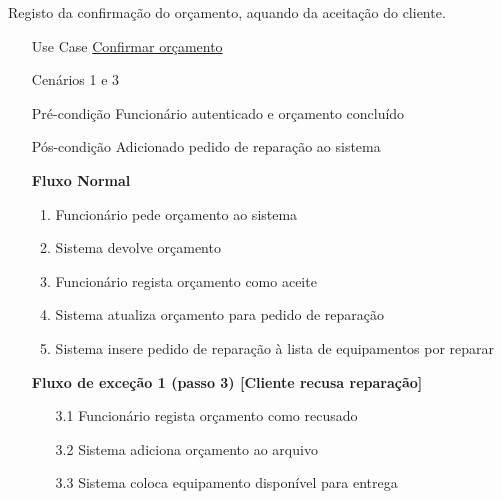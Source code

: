 \documentclass[../relatorio.tex]{subfiles}
\begin{document}
Registo da confirmação do orçamento, aquando da aceitação do cliente.
\begin{itemize}
    \item[Use Case] {\underline{Confirmar orçamento}}
    \item[Cenários] {1 e 3}
    \item[Pré-condição] {Funcionário autenticado e orçamento concluído}
    \item[Pós-condição] {Adicionado pedido de reparação ao sistema}
          \begin{flushleft}
              \textbf{Fluxo Normal}
          \end{flushleft}
          \begin{enumerate}
              \item Funcionário pede orçamento ao sistema
              \item Sistema devolve orçamento
              \item Funcionário regista orçamento como aceite
              \item Sistema atualiza orçamento para pedido de reparação
              \item Sistema insere pedido de reparação à lista de equipamentos por reparar
          \end{enumerate}
          \begin{flushleft}
              \textbf{Fluxo de exceção 1 (passo 3) [Cliente recusa reparação]}
          \end{flushleft}
          \begin{itemize}
              \item[3.1]{Funcionário regista orçamento como recusado}
              \item[3.2]{Sistema adiciona orçamento ao arquivo}
              \item[3.3]{Sistema coloca equipamento disponível para entrega}
          \end{itemize}
\end{itemize}
\end{document}
